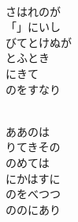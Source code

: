 \documentclass[10pt,b5j]{tarticle} %
\begin{document}
\begin{enumerate}
\begin{minipage}[c]{\blocksize}
        \vspace{\linespace}
        \item~\\
        さはれのが\\
        「」にいし\\
        びてとけぬが\\
        とふとき\\
        にきて\\
        のをすなり
        
        \vspace{\linespace}
        \item~\\
        ああのは\\
        りてきその\\
        のめては\\
        にかはすに\\
        のをべつつ\\
        ののにあり
    
    \end{minipage}
\end{enumerate} %
\end{document}
